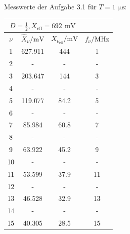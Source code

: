 \documentclass[a4paper, 12pt]{article}
\begin{document}
    \begin{center}
      \vspace{0.021276873\paperheight}
      \vspace{0.021276873\paperheight}

      Messwerte der Aufgabe 3.1 für \emph{$T=1 \,\ \si{\micro\second}$}:\\
      \vspace{0.021276873\paperheight}
      \bgroup
      \def\arraystretch{1.6180339887498948}
        \begin{tabular}{@{}cccc@{}}
        \toprule
        \multicolumn{3}{c}{$D = \frac{1}{2}, X_{\text{eff}}=692 \,\ \si{\milli\volt}$} \\ \midrule
        $\nu$      & $\hat{X}_\nu / \si{\milli\volt}$   & $X_{\nu_{\text{eff}}} / \si{\milli\volt}$ & $f_\nu / \si{\mega\hertz}$ \\ \hline
          1  & 627.911     & 444        & 1        \\
          2  & -           & -          & -        \\
          3  & 203.647     & 144        & 3        \\
          4  & -           & -          & -        \\
          5  & 119.077     & 84.2       & 5        \\
          6  & -           & -          & -        \\
          7  & 85.984      & 60.8       & 7        \\
          8  & -           & -          & -        \\
          9  & 63.922      & 45.2       & 9        \\
          10 & -           & -          & -        \\
          11 & 53.599      & 37.9       & 11       \\
          12 & -           & -          & -        \\
          13 & 46.528      & 32.9       & 13       \\
          14 & -           & -          & -        \\
          15 & 40.305      & 28.5       & 15       \\ \bottomrule
        \end{tabular}
        \egroup
        \vspace{0.021276873\paperheight}
        \bgroup
        \def\arraystretch{1.6180339887498948}
          \begin{tabular}{@{}cccc@{}}

\end{tabular}
\end{center}
\end{document}
